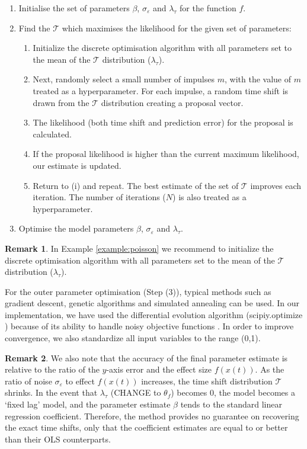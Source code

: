 \documentclass[11pt]{amsart}
\theoremstyle{definition}
\newtheorem{remark}{Remark}[section]
\begin{document}
\begin{enumerate}
    \item [(1)] Initialise the set of parameters $\beta$, $\sigma_{\varepsilon}$ and $\lambda_{\tau}$ for the function $f$.
    \item [(2)] Find the $\mathcal{T}$ which maximises the likelihood for the given set of parameters:
        \begin{enumerate} 
            \item[(i)] Initialize the discrete optimisation algorithm with all parameters set to the mean of the $\mathcal{T}$ distribution ($\lambda_{\tau}$).
            \item[(ii)] Next, randomly select a small number of impulses $m$, with the value of $m$ treated as a hyperparameter. For each impulse, a random time shift is drawn from the $\mathcal{T}$ distribution creating a proposal vector. 
            \item [(iii)]The likelihood (both time shift and prediction error) for the proposal is calculated. 
            \item[(iv)] If the proposal likelihood is higher than the current maximum likelihood, our estimate is updated.
            \item [(v)] Return to (i) and repeat. The best estimate of the set of $\mathcal{T}$ improves each iteration. The number of iterations ($N$) is also treated as a hyperparameter.
        \end{enumerate} 
    \item [(3)] Optimise the model parameters $\beta$, $\sigma_{\varepsilon}$ and $\lambda_{\tau}$.
\end{enumerate}

\begin{remark}
In Example \ref{example:poisson} we recommend to initialize the discrete optimisation algorithm with all parameters set to the mean of the $\mathcal{T}$ distribution ($\lambda_{\tau}$).
\end{remark}

For the outer parameter optimisation (Step (3)), typical methods such as gradient descent, genetic algorithms and simulated annealing can be used.  In our implementation, we have used the differential evolution algorithm \cite{diff_ev} (scipiy.optimize \cite{scipy}) because of its ability to handle noisy objective functions \cite{diff_ev}. In order to improve convergence, we also standardize all input variables to the range (0,1).


\begin{remark}
We also note that the accuracy of the final parameter estimate is relative to the ratio of the $y$-axis error and the effect size $f(x(t))$. 
As the ratio of noise $\sigma_{\varepsilon}$ to effect $f(x(t))$ increases, the time shift distribution $\mathcal{T}$ shrinks. 
In the event that $\lambda_{\tau}$ (CHANGE to $\theta_{f}$) becomes 0, the model becomes a ‘fixed lag’ model, and the parameter estimate $\beta$ tends to the standard linear regression coefficient. Therefore, the method provides no guarantee on recovering the exact time shifts, only that the coefficient estimates are equal to or better than their OLS counterparts.
\end{remark}
\end{document}
